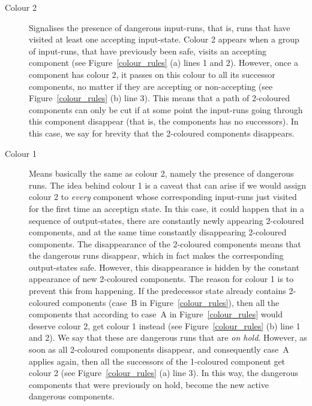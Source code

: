 {
\begin{description}
\item[Colour 2]
Signalises the presence of dangerous input-runs, that is, runs that have visited at least one accepting input-state. Colour 2 appears when a group of input-runs, that have previously been safe, visits an accepting component (see Figure~\ref{colour_rules} (a) lines 1 and 2). However, once a component has colour 2, it passes on this colour to all its successor components, no matter if they are accepting or non-accepting (see Figure~\ref{colour_rules} (b) line 3). This means that a path of 2-coloured components can only be cut if at some point the input-runs going through this component disappear (that is, the components has no successors). In this case, we say for brevity that the 2-coloured components disappears.



\item[Colour 1]
Means basically the same as colour 2, namely the presence of dangerous runs. The idea behind colour 1 is a caveat that can arise if we would assign colour 2 to \textit{every} component whose corresponding input-runs just visited for the first time an acceptign state. In this case, it could happen that in a sequence of output-states, there are constantly newly appearing 2-coloured components, and at the same time constantly disappearing 2-coloured components. The disappearance of the 2-coloured components means that the dangerous runs disappear, which in fact makes the corresponding output-states safe. However, this disappearance is hidden by the constant appearance of new 2-coloured components. The reason for colour 1 is to prevent this from happening. If the predecessor state already contains 2-coloured components (case~B in Figure~\ref{colour_rules}), then all the components that according to case~A in Figure~\ref{colour_rules} would deserve colour 2, get colour 1 instead (see Figure~\ref{colour_rules} (b) line 1 and 2). We say that these are dangerous runs that are \textit{on hold}. However, as soon as all 2-coloured components disappear, and consequently case~A applies again, then all the successors of the 1-coloured component get colour 2 (see Figure~\ref{colour_rules} (a) line 3). In this way, the dangerous components that were previously on hold, become the new active dangerous components.


\end{description}}
